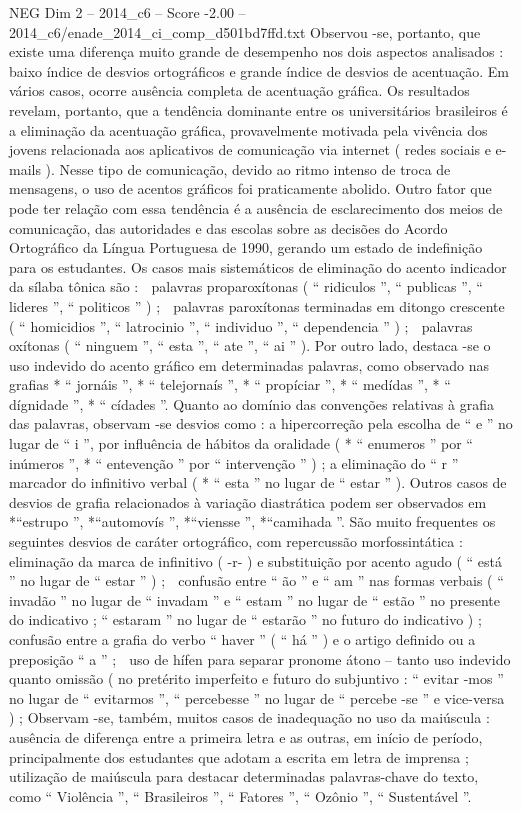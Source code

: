 \begin{textsample}{NEG Dim 2 – 2014\_c6 – Score -2.00 – 2014\_c6/enade\_2014\_ci\_comp\_d501bd7ffd.txt}
Observou -se, portanto, que existe uma diferença muito grande de desempenho nos dois aspectos analisados : baixo índice de desvios ortográficos e grande índice de desvios de acentuação.
Em vários casos, ocorre ausência completa de acentuação gráfica.
Os resultados revelam, portanto, que a tendência dominante entre os universitários brasileiros é a eliminação da acentuação gráfica, provavelmente motivada pela vivência dos jovens relacionada aos aplicativos de comunicação via internet ( redes sociais e e-mails ).
Nesse tipo de comunicação, devido ao ritmo intenso de troca de mensagens, o uso de acentos gráficos foi praticamente abolido.
Outro fator que pode ter relação com essa tendência é a ausência de esclarecimento dos meios de comunicação, das autoridades e das escolas sobre as decisões do Acordo Ortográfico da Língua Portuguesa de 1990, gerando um estado de indefinição para os estudantes.
Os casos mais sistemáticos de eliminação do acento indicador da sílaba tônica são :  palavras proparoxítonas ( “ ridiculos ”, “ publicas ”, “ lideres ”, “ politicos ” ) ;  palavras paroxítonas terminadas em ditongo crescente ( “ homicidios ”, “ latrocinio ”, “ individuo ”, “ dependencia ” ) ;  palavras oxítonas ( “ ninguem ”, “ esta ”, “ ate ”, “ ai ” ).
Por outro lado, destaca -se o uso indevido do acento gráfico em determinadas palavras, como observado nas grafias * “ jornáis ”, * “ telejornaís ”, * “ propíciar ”, * “ medídas ”, * “ dígnidade ”, * “ cídades ”.
Quanto ao domínio das convenções relativas à grafia das palavras, observam -se desvios como : a hipercorreção pela escolha de “ e ” no lugar de “ i ”, por influência de hábitos da oralidade ( * “ enumeros ” por “ inúmeros ”, * “ entevenção ” por “ intervenção ” ) ; a eliminação do “ r ” marcador do infinitivo verbal ( * “ esta ” no lugar de “ estar ” ).
Outros casos de desvios de grafia relacionados à variação diastrática podem ser observados em *“estrupo ”, *“automovís ”, *“viensse ”, *“camihada ”.
São muito frequentes os seguintes desvios de caráter ortográfico, com repercussão morfossintática :  eliminação da marca de infinitivo ( -r- ) e substituição por acento agudo ( “ está ” no lugar de “ estar ” ) ;  confusão entre “ ão ” e “ am ” nas formas verbais ( “ invadão ” no lugar de “ invadam ” e “ estam ” no lugar de “ estão ” no presente do indicativo ; “ estaram ” no lugar de “ estarão ” no futuro do indicativo ) ;  confusão entre a grafia do verbo “ haver ” ( “ há ” ) e o artigo definido ou a preposição “ a ” ;  uso de hífen para separar pronome átono – tanto uso indevido quanto omissão ( no pretérito imperfeito e futuro do subjuntivo : “ evitar -mos ” no lugar de “ evitarmos ”, “ percebesse ” no lugar de “ percebe -se ” e vice-versa ) ; Observam -se, também, muitos casos de inadequação no uso da maiúscula : ausência de diferença entre a primeira letra e as outras, em início de período, principalmente dos estudantes que adotam a escrita em letra de imprensa ; utilização de maiúscula para destacar determinadas palavras-chave do texto, como “ Violência ”, “ Brasileiros ”, “ Fatores ”, “ Ozônio ”, “ Sustentável ”.

\end{textsample}
